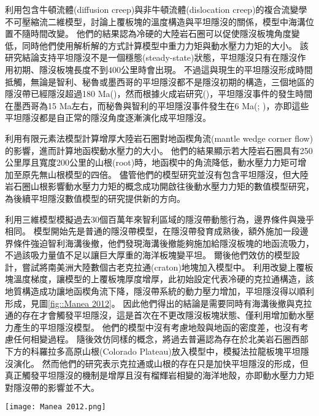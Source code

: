 \citet{Thermal2012}利用包含牛頓流體(diffusion creep)與非牛頓流體(dislocation creep)的複合流變學不可壓縮流二維模型，討論上覆板塊的溫度構造與平坦隱沒的關係，模型中海溝位置不隨時間改變。
他們的結果認為冷硬的大陸岩石圈可以促使隱沒板塊角度變低，同時他們使用解析解的方式計算模型中重力力矩與動水壓力力矩的大小。
該研究結論支持平坦隱沒不是一個穩態(steady-state)狀態，平坦隱沒只有在隱沒作用初期、隱沒板塊長度不到400公里時會出現。
不過這與現生的平坦隱沒形成時間抵觸，無論是智利、秘魯或墨西哥的平坦隱沒都不是隱沒初期的構造，三個地區的隱沒帶已經隱沒超過180 Ma(\citealp{Schellart2021})，然而根據火成岩研究(\citealp{Manea2017})，平坦隱沒事件的發生時間在墨西哥為15 Ma左右，而秘魯與智利的平坦隱沒事件發生在6 Ma(\citealp{chen2019southward}; \citealp{hu2021southward})，亦即這些平坦隱沒都是自正常的隱沒角度逐漸演化成平坦隱沒。

\citet{o2009subduction}利用有限元素法模型計算增厚大陸岩石圈對地函楔角流(mantle wedge corner flow)的影響，進而計算地函楔動水壓力的大小。
他們的結果顯示若大陸岩石圈具有250公里厚且寬度200公里的山根(root)時，地函楔中的角流降低，動水壓力力矩可增加至原先無山根模型的四倍。
儘管他們的模型研究並沒有包含平坦隱沒，但大陸岩石圈山根影響動水壓力力矩的概念成功開啟往後動水壓力力矩的數值模型研究，為後續平坦隱沒數值模型的研究提供新的方向。

\citet{Manea2012Chile}利用三維模型模擬過去30個百萬年來智利區域的隱沒帶動態行為，邊界條件與\citet{Thermal2012}幾乎相同。
模型開始先是普通的隱沒帶模型，在隱沒帶發育成熟後，額外施加一段邊界條件強迫智利海溝後撤，他們發現海溝後撤能夠施加給隱沒板塊的地函流吸力，不過該吸力量值不足以讓巨大厚重的海洋板塊變平坦。
爾後他們效仿\citet{o2009subduction}的模型設計，嘗試將南美洲大陸數個古老克拉通(craton)地塊加入模型中。
利用改變上覆板塊溫度梯度，讓模型的上覆板塊厚度增厚，此初始設定代表冷硬的克拉通構造，該地質構造成功讓地函楔角流下降，隱沒帶系統的動力壓力增加，平坦隱沒得以順利形成，見圖\ref{fig::Manea 2012}。
因此他們得出的結論是需要同時有海溝後撤與克拉通的存在才會觸發平坦隱沒，這是首次在不更改隱沒板塊狀態、僅利用增加動水壓力產生的平坦隱沒模型。
他們的模型中沒有考慮地殼與地函的密度差，也沒有考慮任何相變過程。
隨後\citet{Liu2016}效仿同樣的概念，將過去普遍認為存在於北美岩石圈西部下方的科羅拉多高原山根(Colorado Plateau)放入模型中，模擬法拉龍板塊平坦隱沒演化。
然而他們的研究表示克拉通或山根的存在只是加快平坦隱沒的形成，但真正觸發平坦隱沒的機制是增厚且沒有榴輝岩相變的海洋地殼，亦即動水壓力力矩對隱沒帶的影響並不大。
\begin{figure*}[ht!]
    \centering
    \texttt{[image: Manea 2012.png]}
    \caption[\citet{Manea2012Chile}中的智利平坦隱沒模型]{\citet{Manea2012Chile}中的智利平坦隱沒模型，模型中同時加入海溝後撤邊界條件與增厚大陸岩石圈可以讓平坦隱沒發育。模型背景顏色為溫度。
    }
    \label{fig::Manea 2012}
\end{figure*}

